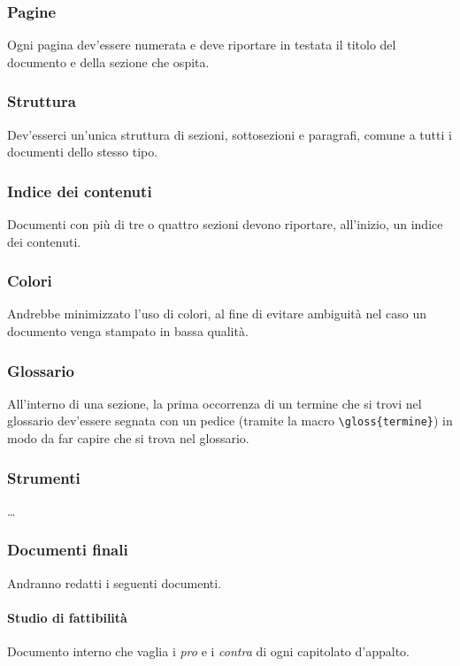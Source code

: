 \subsubsection{Pagine} Ogni pagina dev'essere numerata e deve riportare in testata il titolo del documento e della sezione che ospita. %

\subsubsection{Struttura} Dev'esserci un'unica struttura di sezioni, sottosezioni e paragrafi, comune a tutti i documenti dello stesso tipo.

\subsubsection{Indice dei contenuti} Documenti con più di tre o quattro sezioni devono riportare, all'inizio, un indice dei contenuti.

\subsubsection{Colori} Andrebbe minimizzato l'uso di colori, al fine di evitare ambiguità nel caso un documento venga stampato in bassa qualità.

\subsubsection{Glossario} All'interno di una sezione, la prima occorrenza di un termine che si trovi nel glossario dev'essere segnata con un pedice (tramite la macro \texttt{\textbackslash gloss\{termine\}}) in modo da far capire che si trova nel glossario.

\subsubsection{Strumenti} \dots

\subsubsection{Documenti finali} Andranno redatti i seguenti documenti.
\paragraph{Studio di fattibilità} Documento interno che vaglia i \emph{pro} e i \emph{contra} di ogni capitolato d'appalto.
